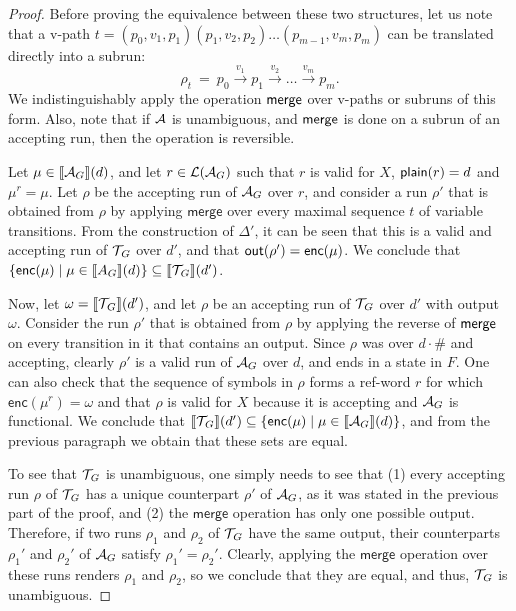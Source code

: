 \begin{proof}
	Before proving the equivalence between these two structures, let us note that a v-path $t = (p_0, v_1, p_1)(p_1, v_2, p_2)\ldots(p_{m-1}, v_{m}, p_{m})$ can be translated directly into a subrun:
	\[
	\rho_t \ = \ p_0\xrightarrow{v_1}p_1\xrightarrow{v_2}\ldots \xrightarrow{v_m} p_{m}.
	\]
	We indistinguishably apply the operation ${\sf merge}$ over v-paths or subruns of this form. Also, note that if $\mathcal{A}$ is unambiguous, and ${\sf merge}$ is done on a subrun of an accepting run, then the operation is reversible.
	
	Let $\mu\in{\llbracket{\mathcal{A}_G}\rrbracket}(d)$, and let $r\in \mathcal{L}(\mathcal{A}_G)$ such that $r$ is valid for $X$, $\text{\sf plain}(r) = d$ and $\mu^r = \mu$. Let $\rho$ be the accepting run of $\mathcal{A}_G$ over $r$, and consider a run $\rho'$ that is obtained from $\rho$ by applying $\textsf{merge}$ over every maximal sequence $t$ of variable transitions. From the construction of $\Delta'$, it can be seen that this is a valid and accepting run of $\mathcal{T}\!_G$ over $d'$, and that $\textsf{out}(\rho') = \textsf{enc}(\mu)$. We conclude that $\{\textsf{enc}(\mu)\mid \mu\in{\llbracket{A_G}\rrbracket}(d)\}\subseteq \llbracket \mathcal{T}\!_G \rrbracket(d')$.
	
	Now, let $\omega = \llbracket \mathcal{T}\!_G \rrbracket(d')$, and let $\rho$ be an accepting run of $\mathcal{T}\!_G$ over $d'$ with output $\omega$. Consider the run $\rho'$ that is obtained from $\rho$ by applying the reverse of ${\sf merge}$ on every transition in it that contains an output. Since $\rho$ was over $d\cdot\#$ and accepting, clearly $\rho'$ is a valid run of $\mathcal{A}_G$ over $d$, and ends in a state in $F$. One can also check that the sequence of symbols in $\rho$ forms a ref-word $r$ for which $\textsf{enc}(\mu^r) = \omega$ and that $\rho$ is valid for $X$ because it is accepting and $\mathcal{A}_G$ is functional.  We conclude that  $\llbracket \mathcal{T}\!_G \rrbracket(d') \subseteq \{\textsf{enc}(\mu)\mid \mu\in{\llbracket{\mathcal{A}_G}\rrbracket}(d)\}$, and from the previous paragraph we obtain that these sets are equal.
	
	To see that $\mathcal{T}\!_G$ is unambiguous, one simply needs to see that (1) every accepting run $\rho$ of $\mathcal{T}\!_G$ has a unique counterpart $\rho'$ of $\mathcal{A}_G$, as it was stated in the previous part of the proof, and (2) the $\textsf{merge}$ operation has only one possible output. Therefore, if two runs $\rho_1$ and $\rho_2$ of $\mathcal{T}\!_G$ have the same output, their counterparts $\rho_1'$ and $\rho_2'$  of $\mathcal{A}_G$ satisfy $\rho_1' = \rho_2'$. Clearly, applying the $\textsf{merge}$ operation over these runs renders $\rho_1$ and $\rho_2$, so we conclude that they are equal, and thus, $\mathcal{T}\!_G$ is unambiguous.
	

\end{proof}
